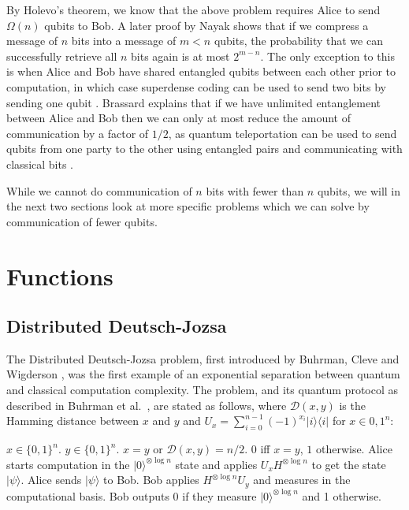 \documentclass[a4paper]{article}
\begin{document}
    By Holevo's theorem, we know that the above problem requires Alice to send $\Omega(n)$ qubits to Bob. A later proof by Nayak \cite{814608} shows that if we compress a message of $n$ bits into a message of $m < n$ qubits, the probability that we can successfully retrieve all $n$ bits again is at most $2^{m-n}$. The only exception to this is when Alice and Bob have shared entangled qubits between each other prior to computation, in which case superdense coding can be used to send two bits by sending one qubit \cite{PhysRevLett.69.2881}. Brassard \cite{quant-ph/0101005} explains that if we have unlimited entanglement between Alice and Bob then we can only at most reduce the amount of communication by a factor of $1/2$, as quantum teleportation can be used to send qubits from one party to the other using entangled pairs and communicating with classical bits \cite{PhysRevLett.70.1895}.

    While we cannot do communication of $n$ bits with fewer than $n$ qubits, we will in the next two sections look at more specific problems which we can solve by communication of fewer qubits.

    \section{Functions}

        \subsection{Distributed Deutsch-Jozsa}

        The Distributed Deutsch-Jozsa problem, first introduced by Buhrman, Cleve and Wigderson \cite{Buhrman:1998:QVC:276698.276713}, was the first example of an exponential separation between quantum and classical computation complexity. The problem, and its quantum protocol as described in Buhrman et al.~\cite{RevModPhys.82.665}, are stated as follows, where $\mathcal{D}(x, y)$ is the Hamming distance between $x$ and $y$ and $U_x = \sum_{i=0}^{n-1}(-1)^{x_i}|i\rangle\langle i|$ for $x \in {0, 1}^n$:

        \begin{codebox}
            \zi {} $x \in \{0, 1\}^n$.
            \zi {} $y \in \{0, 1\}^n$.
            \zi {} $x = y$ or $\mathcal{D}(x, y) = n/2$.
            \zi {} $0$ iff $x = y$, $1$ otherwise.
            \li Alice starts computation in the $|0\rangle^{\otimes \log n}$ state and applies $U_xH^{\otimes \log n}$ to get the state $|\psi\rangle$.
            \li Alice sends $|\psi\rangle$ to Bob.
            \li Bob applies $H^{\otimes \log n}U_y$ and measures in the computational basis.
            \li Bob outputs $0$ if they measure $|0\rangle^{\otimes \log n}$ and 1 otherwise.
            \End
        \end{codebox}
\end{document}
